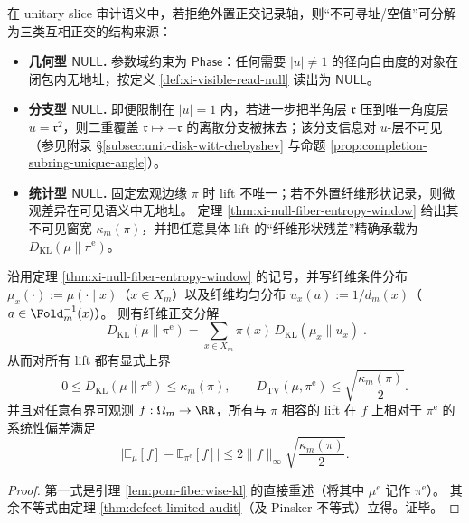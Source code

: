 \begin{remark}\label{rem:xi-null-three-kinds}
在 unitary slice 审计语义中，若拒绝外置正交记录轴，则“不可寻址/空值”可分解为三类互相正交的结构来源：
\begin{itemize}
  \item \textbf{几何型 \(\mathsf{NULL}\).} 参数域约束为 \(\mathsf{Phase}\)：任何需要 \(|u|\neq 1\) 的径向自由度的对象在闭包内无地址，按定义 \ref{def:xi-visible-read-null} 读出为 \(\mathsf{NULL}\)。
  \item \textbf{分支型 \(\mathsf{NULL}\).} 即便限制在 \(|u|=1\) 内，若进一步把半角层 \(\mathfrak r\) 压到唯一角度层 \(u=\mathfrak r^2\)，则二重覆盖 \(\mathfrak r\mapsto-\mathfrak r\) 的离散分支被抹去；该分支信息对 \(u\)-层不可见（参见附录 \S\ref{subsec:unit-disk-witt-chebyshev} 与命题 \ref{prop:completion-subring-unique-angle}）。
  \item \textbf{统计型 \(\mathsf{NULL}\).} 固定宏观边缘 \(\pi\) 时 lift 不唯一；若不外置纤维形状记录，则微观差异在可见语义中无地址。
  定理 \ref{thm:xi-null-fiber-entropy-window} 给出其不可见窗宽 \(\kappa_m(\pi)\)，并把任意具体 lift 的“纤维形状残差”精确承载为 \(D_{\mathrm{KL}}(\mu\|\pi^{\mathrm{e}})\)。
\end{itemize}
\end{remark}

\begin{corollary}\label{cor:xi-null-statistical-radius}
沿用定理 \ref{thm:xi-null-fiber-entropy-window} 的记号，并写纤维条件分布 \(\mu_x(\cdot):=\mu(\cdot\mid x)\)（\(x\in X_m\)）以及纤维均匀分布 \(u_x(a):=1/d_m(x)\)（\(a\in\Fold_m^{-1}(x)\)）。
则有纤维正交分解
\[
\boxed{\;
D_{\mathrm{KL}}(\mu\|\pi^{\mathrm{e}})
=\sum_{x\in X_m}\pi(x)\,D_{\mathrm{KL}}(\mu_x\|u_x)\; }.
\]
从而对所有 lift 都有显式上界
\[
0\le D_{\mathrm{KL}}(\mu\|\pi^{\mathrm{e}})\le \kappa_m(\pi),
\qquad
D_{\mathrm{TV}}(\mu,\pi^{\mathrm{e}})\le \sqrt{\frac{\kappa_m(\pi)}{2}}.
\]
并且对任意有界可观测 \(f:\Omega_m\to\RR\)，所有与 \(\pi\) 相容的 lift 在 \(f\) 上相对于 \(\pi^{\mathrm{e}}\) 的系统性偏差满足
\[
\bigl|\mathbb{E}_\mu[f]-\mathbb{E}_{\pi^{\mathrm{e}}}[f]\bigr|
\le 2\|f\|_\infty\sqrt{\frac{\kappa_m(\pi)}{2}}.
\]
\end{corollary}

\begin{proof}
第一式是引理 \ref{lem:pom-fiberwise-kl} 的直接重述（将其中 \(\mu^e\) 记作 \(\pi^{\mathrm{e}}\)）。
其余不等式由定理 \ref{thm:defect-limited-audit}（及 Pinsker 不等式）立得。证毕。
\end{proof}


